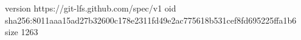 version https://git-lfs.github.com/spec/v1
oid sha256:8011aaa15ad27b32600c178e2311fd49e2ac775618b531cef8fd695225ffa1b6
size 1263
